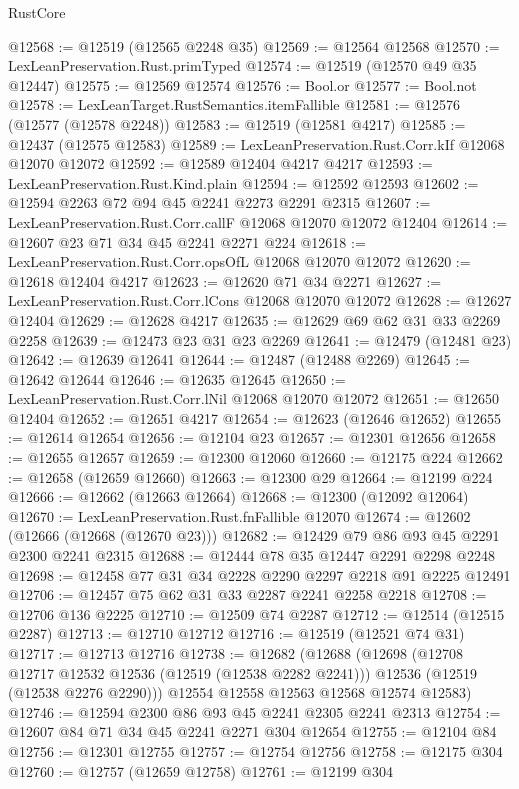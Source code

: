 \begin{lexlean}{RustCore}
\begin{coremodule}
@12568 := @12519 (@12565 @2248 @35)
@12569 := @12564 @12568
@12570 := LexLeanPreservation.Rust.primTyped
@12574 := @12519 (@12570 @49 @35 @12447)
@12575 := @12569 @12574
@12576 := Bool.or
@12577 := Bool.not
@12578 := LexLeanTarget.RustSemantics.itemFallible
@12581 := @12576 (@12577 (@12578 @2248))
@12583 := @12519 (@12581 @4217)
@12585 := @12437 (@12575 @12583)
@12589 := LexLeanPreservation.Rust.Corr.kIf @12068 @12070 @12072
@12592 := @12589 @12404 @4217 @4217
@12593 := LexLeanPreservation.Rust.Kind.plain
@12594 := @12592 @12593
@12602 := @12594 @2263 @72 @94 @45 @2241 @2273 @2291 @2315
@12607 := LexLeanPreservation.Rust.Corr.callF @12068 @12070 @12072 @12404
@12614 := @12607 @23 @71 @34 @45 @2241 @2271 @224
@12618 := LexLeanPreservation.Rust.Corr.opsOfL @12068 @12070 @12072
@12620 := @12618 @12404 @4217
@12623 := @12620 @71 @34 @2271
@12627 := LexLeanPreservation.Rust.Corr.lCons @12068 @12070 @12072
@12628 := @12627 @12404
@12629 := @12628 @4217
@12635 := @12629 @69 @62 @31 @33 @2269 @2258
@12639 := @12473 @23 @31 @23 @2269
@12641 := @12479 (@12481 @23)
@12642 := @12639 @12641
@12644 := @12487 (@12488 @2269)
@12645 := @12642 @12644
@12646 := @12635 @12645
@12650 := LexLeanPreservation.Rust.Corr.lNil @12068 @12070 @12072
@12651 := @12650 @12404
@12652 := @12651 @4217
@12654 := @12623 (@12646 @12652)
@12655 := @12614 @12654
@12656 := @12104 @23
@12657 := @12301 @12656
@12658 := @12655 @12657
@12659 := @12300 @12060
@12660 := @12175 @224
@12662 := @12658 (@12659 @12660)
@12663 := @12300 @29
@12664 := @12199 @224
@12666 := @12662 (@12663 @12664)
@12668 := @12300 (@12092 @12064)
@12670 := LexLeanPreservation.Rust.fnFallible @12070
@12674 := @12602 (@12666 (@12668 (@12670 @23)))
@12682 := @12429 @79 @86 @93 @45 @2291 @2300 @2241 @2315
@12688 := @12444 @78 @35 @12447 @2291 @2298 @2248
@12698 := @12458 @77 @31 @34 @2228 @2290 @2297 @2218 @91 @2225 @12491
@12706 := @12457 @75 @62 @31 @33 @2287 @2241 @2258 @2218
@12708 := @12706 @136 @2225
@12710 := @12509 @74 @2287
@12712 := @12514 (@12515 @2287)
@12713 := @12710 @12712
@12716 := @12519 (@12521 @74 @31)
@12717 := @12713 @12716
@12738 := @12682
    (@12688
      (@12698
        (@12708 @12717 @12532 @12536 (@12519 (@12538 @2282 @2241)))
        @12536
        (@12519 (@12538 @2276 @2290)))
      @12554
      @12558
      @12563
      @12568
      @12574
      @12583)
@12746 := @12594 @2300 @86 @93 @45 @2241 @2305 @2241 @2313
@12754 := @12607 @84 @71 @34 @45 @2241 @2271 @304 @12654
@12755 := @12104 @84
@12756 := @12301 @12755
@12757 := @12754 @12756
@12758 := @12175 @304
@12760 := @12757 (@12659 @12758)
@12761 := @12199 @304

\end{coremodule}
\end{lexlean}
